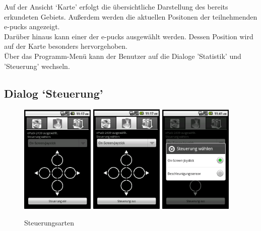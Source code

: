 \documentclass[10pt,a4paper]{article}
\begin{document}
			Auf der Ansicht `Karte' erfolgt die übersichtliche Darstellung des bereits erkundeten Gebiets. Außerdem werden
			die aktuellen Positonen der teilnehmenden e-pucks angezeigt. \\			
			Darüber hinaus kann einer der e-pucks ausgewählt werden. Dessen Position wird auf der Karte besonders hervorgehoben.\\
			Über das Programm-Menü kann der Benutzer auf die Dialoge 'Statistik' und 'Steuerung' wechseln.
			\subsection{Dialog `Steuerung'}
			
			\begin{figure}[h]
				  \centering
				\includegraphics[width=3.5cm]{screenshots/android2.png}
				\includegraphics[width=3.5cm]{screenshots/android2a.png}
				\includegraphics[width=3.5cm]{screenshots/android2c.png}
  				\caption{Steuerungsarten}
  			\end{figure}	
			
\end{document}
